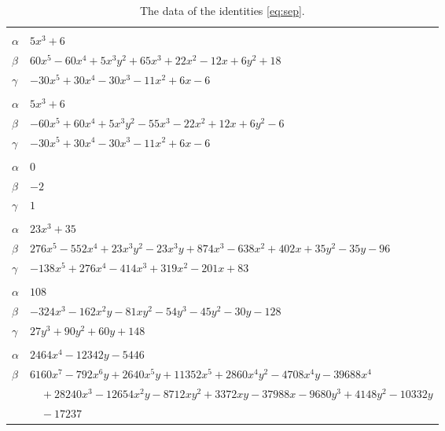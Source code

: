 \documentclass[11pt]{article}
\begin{document}
\begingroup\footnotesize
\setlength{\LTcapwidth}{\textwidth}
\begin{longtable}{@{}ll@{}}
\caption{The data of the identities \eqref{eq:sep}.}\label{tab:sep}\\
\hline\endfirsthead\hline\endhead\hline\endfoot
\multicolumn{2}{@{}l}{$\{i,j\}=\{0,83\}$, $k_{ij}=2\cdot 3$}\\
$\alpha$ & $5x^{3}+6$\\
$\beta$ & $60x^{5}-60x^{4}+5x^{3}y^{2}+65x^{3}+22x^{2}-12x+6y^{2}+18$\\
$\gamma$ & $-30x^{5}+30x^{4}-30x^{3}-11x^{2}+6x-6$\\
\addlinespace[3pt]
\multicolumn{2}{@{}l}{$\{i,j\}=\{0,86\}$, $k_{ij}=2\cdot 3$}\\
$\alpha$ & $5x^{3}+6$\\
$\beta$ & $-60x^{5}+60x^{4}+5x^{3}y^{2}-55x^{3}-22x^{2}+12x+6y^{2}-6$\\
$\gamma$ & $-30x^{5}+30x^{4}-30x^{3}-11x^{2}+6x-6$\\
\addlinespace[3pt]
\multicolumn{2}{@{}l}{$\{i,j\}=\{1,12\}$, $k_{ij}=1$}\\
$\alpha$ & $0$\\
$\beta$ & $-2$\\
$\gamma$ & $1$\\
\addlinespace[3pt]
\multicolumn{2}{@{}l}{$\{i,j\}=\{1,93\}$, $k_{ij}=2^{4}\cdot 3$}\\
$\alpha$ & $23x^{3}+35$\\
$\beta$ & $276x^{5}-552x^{4}+23x^{3}y^{2}-23x^{3}y+874x^{3}-638x^{2}+402x+35y^{2}-35y-96$\\
$\gamma$ & $-138x^{5}+276x^{4}-414x^{3}+319x^{2}-201x+83$\\
\addlinespace[3pt]
\multicolumn{2}{@{}l}{$\{i,j\}=\{2,13\}$, $k_{ij}=2^{8}$}\\
$\alpha$ & $108$\\
$\beta$ & $-324x^{3}-162x^{2}y-81xy^{2}-54y^{3}-45y^{2}-30y-128$\\
$\gamma$ & $27y^{3}+90y^{2}+60y+148$\\
\addlinespace[3pt]
\multicolumn{2}{@{}l}{$\{i,j\}=\{2,63\}$, $k_{ij}=3^{3}$}\\
$\alpha$ & $2464x^{4}-12342y-5446$\\
$\beta$ & $6160x^{7}-792x^{6}y+2640x^{5}y+11352x^{5}+2860x^{4}y^{2}-4708x^{4}y-39688x^{4}$\\
 & $\quad +28240x^{3}-12654x^{2}y-8712xy^{2}+3372xy-37988x-9680y^{3}+4148y^{2}-10332y$\\
 & $\quad -17237$\\

\end{longtable}
\end{document}
